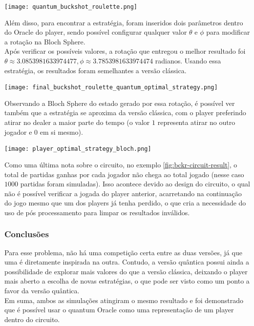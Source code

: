 \documentclass{article}
\begin{document}
\begin{center}
	\texttt{[image: quantum\_buckshot\_roulette.png]}
	\label{fig:bckr-circuit}
\end{center}

Além disso, para encontrar a estratégia, foram inseridos dois parâmetros dentro do Oracle do player, sendo possível configurar qualquer valor $\theta$ e $\phi$ para modificar a rotação na Bloch Sphere.\\
Após verificar os possíveis valores, a rotação que entregou o melhor resultado foi $\theta\approx 3.0853981633974477, \phi\approx3.7853981633974474$ radianos. Usando essa estratégia, os resultados foram semelhantes a versão clássica.

\begin{center}
	\texttt{[image: final\_buckshot\_roulette\_quantum\_optimal\_strategy.png]}
	\label{fig:bckr-circuit-result}
\end{center}

Observando a Bloch Sphere do estado gerado por essa rotação, é possível ver também que a estratégia se aproxima da versão clássica, com o player preferindo atirar no dealer a maior parte do tempo (o valor $1$ representa atirar no outro jogador e $0$ em si mesmo).

\begin{center}
	\texttt{[image: player\_optimal\_strategy\_bloch.png]}
	\label{fig:bckr-bloch-sphere-best-strategy}
\end{center}

Como uma última nota sobre o circuito, no exemplo \ref{fig:bckr-circuit-result}, o total de partidas ganhas por cada jogador não chega ao total jogado (nesse caso $1000$ partidas foram simuladas). Isso acontece devido ao design do circuito, o qual não é possível verificar a jogada do player anterior, acarretando na continuação do jogo mesmo que um dos players já tenha perdido, o que cria a necessidade do uso de pós processamento para limpar os resultados inválidos.

\subsubsection{Conclusões}
Para esse problema, não há uma competição certa entre as duas versões, já que uma é diretamente inspirada na outra. Contudo, a versão quântica possui ainda a possibilidade de explorar mais valores do que a versão clássica, deixando o player mais aberto a escolha de novas estratégias, o que pode ser visto como um ponto a favor da versão quântica.\\
Em suma, ambos as simulações atingiram o mesmo resultado e foi demonstrado que é possível usar o quantum Oracle como uma representação de um player dentro do circuito.
\end{document}
